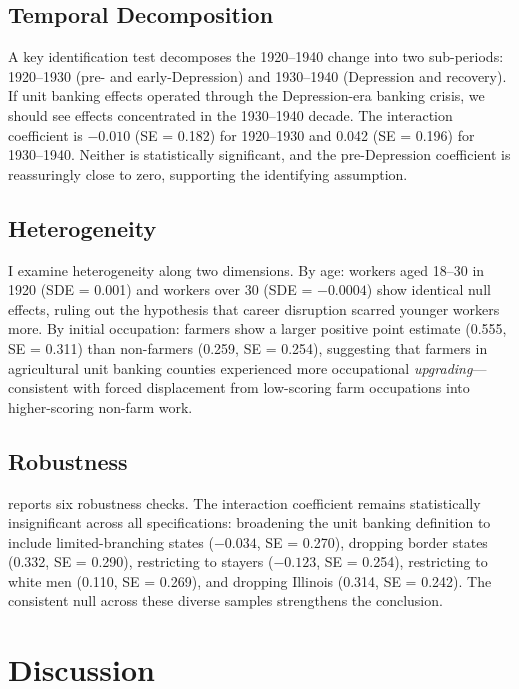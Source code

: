 \documentclass[12pt]{article}
\begin{document}
\subsection{Temporal Decomposition}

A key identification test decomposes the 1920--1940 change into two sub-periods: 1920--1930 (pre- and early-Depression) and 1930--1940 (Depression and recovery). If unit banking effects operated through the Depression-era banking crisis, we should see effects concentrated in the 1930--1940 decade. The interaction coefficient is $-0.010$ (SE = 0.182) for 1920--1930 and 0.042 (SE = 0.196) for 1930--1940. Neither is statistically significant, and the pre-Depression coefficient is reassuringly close to zero, supporting the identifying assumption.

\subsection{Heterogeneity}

I examine heterogeneity along two dimensions. By age: workers aged 18--30 in 1920 (SDE = 0.001) and workers over 30 (SDE = $-0.0004$) show identical null effects, ruling out the hypothesis that career disruption scarred younger workers more. By initial occupation: farmers show a larger positive point estimate (0.555, SE = 0.311) than non-farmers (0.259, SE = 0.254), suggesting that farmers in agricultural unit banking counties experienced more occupational \textit{upgrading}---consistent with forced displacement from low-scoring farm occupations into higher-scoring non-farm work.

\subsection{Robustness}

 reports six robustness checks. The interaction coefficient remains statistically insignificant across all specifications: broadening the unit banking definition to include limited-branching states ($-0.034$, SE = 0.270), dropping border states (0.332, SE = 0.290), restricting to stayers ($-0.123$, SE = 0.254), restricting to white men (0.110, SE = 0.269), and dropping Illinois (0.314, SE = 0.242). The consistent null across these diverse samples strengthens the conclusion.




\section{Discussion}
\label{sec:discussion}
\end{document}
